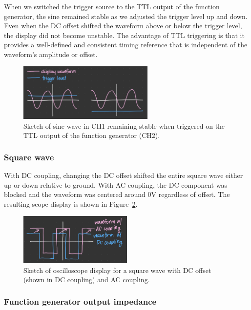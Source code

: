 \documentclass{article}
\begin{document}
\noindent When we switched the trigger source to the TTL output of the function
generator, the sine remained stable as we adjusted the trigger level up and
down. Even when the DC offset shifted the waveform above or below the trigger
level, the display did not become unstable. The advantage of TTL triggering is
that it provides a well-defined and consistent timing reference that is
independent of the waveform's amplitude or offset.

\begin{figure}[H]
    \centering
    \includegraphics[width=0.60\textwidth]{1.4.bb.png}
    \caption{Sketch of sine wave in CH1 remaining stable when triggered on the TTL output of the function generator (CH2).}
    \label{fig:ttl_output}
\end{figure}

\subsubsection{Square wave}

With DC coupling, changing the DC offset shifted the entire square wave either
up or down relative to ground. With AC coupling, the DC component was blocked 
and the waveform was centered around $0\si{\volt}$ regardless of offset. The
resulting scope display is shown in Figure~\ref{fig:dc_coupling}.

\begin{figure}[H]
    \centering
    \includegraphics[width=0.5\textwidth]{1.4.ca.png}
    \caption{Sketch of oscilloscope display for a square wave with DC offset (shown in DC coupling) and AC coupling.}
    \label{fig:dc_coupling}
\end{figure}

\subsubsection{Function generator output impedance}
\end{document}
